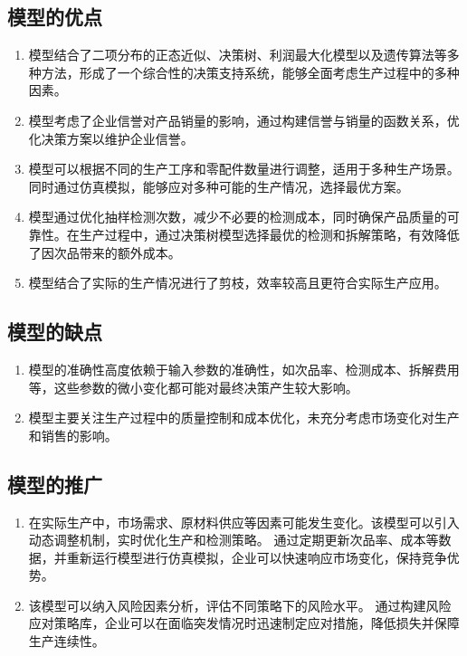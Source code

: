 \documentclass[utf8]{ctexart} %
\begin{document}
		\subsection{模型的优点}
		\begin{enumerate}[itemsep=0pt, parsep=0pt, label=(\arabic*)] %
			\item 模型结合了二项分布的正态近似、决策树、利润最大化模型以及遗传算法等多种方法，形成了一个综合性的决策支持系统，能够全面考虑生产过程中的多种因素。
			\item 模型考虑了企业信誉对产品销量的影响，通过构建信誉与销量的函数关系，优化决策方案以维护企业信誉。
			\item 模型可以根据不同的生产工序和零配件数量进行调整，适用于多种生产场景。同时通过仿真模拟，能够应对多种可能的生产情况，选择最优方案。
			\item 模型通过优化抽样检测次数，减少不必要的检测成本，同时确保产品质量的可靠性。在生产过程中，通过决策树模型选择最优的检测和拆解策略，有效降低了因次品带来的额外成本。
			\item 模型结合了实际的生产情况进行了剪枝，效率较高且更符合实际生产应用。
			
					\end{enumerate} 
		\subsection{模型的缺点}
					\begin{enumerate}[itemsep=0pt, parsep=0pt, label=(\arabic*)] %
					\item 模型的准确性高度依赖于输入参数的准确性，如次品率、检测成本、拆解费用等，这些参数的微小变化都可能对最终决策产生较大影响。
					\item 模型主要关注生产过程中的质量控制和成本优化，未充分考虑市场变化对生产和销售的影响。
			\end{enumerate} 
		\subsection{模型的推广}
			\begin{enumerate}[itemsep=0pt, parsep=0pt, label=(\arabic*)] %
				\item
				在实际生产中，市场需求、原材料供应等因素可能发生变化。该模型可以引入动态调整机制，实时优化生产和检测策略。  通过定期更新次品率、成本等数据，并重新运行模型进行仿真模拟，企业可以快速响应市场变化，保持竞争优势。  
				
				\item  该模型可以纳入风险因素分析，评估不同策略下的风险水平。  
				通过构建风险应对策略库，企业可以在面临突发情况时迅速制定应对措施，降低损失并保障生产连续性。  
				\end{enumerate}
		
\end{document}
